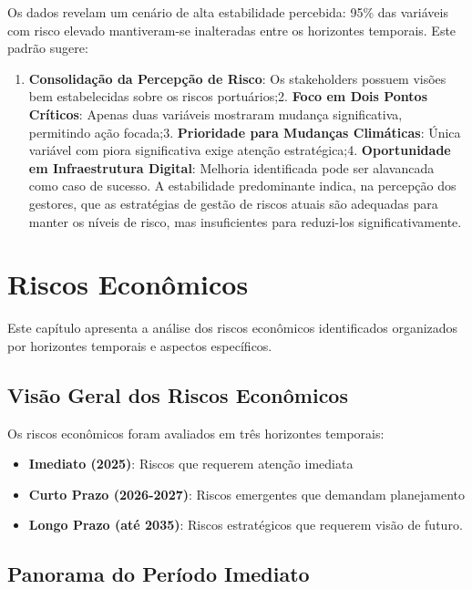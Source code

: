 \documentclass[
  portuguese,
  letterpaper,
  DIV=11,
  numbers=noendperiod]{scrreprt}
\providecommand{\tightlist}{%
  \setlength{\itemsep}{0pt}\setlength{\parskip}{0pt}}
\begin{document}
Os dados revelam um cenário de alta estabilidade percebida: 95\% das
variáveis com risco elevado mantiveram-se inalteradas entre os
horizontes temporais. Este padrão sugere:

\begin{enumerate}
\def\labelenumi{\arabic{enumi}.}
\tightlist
\item
  \textbf{Consolidação da Percepção de Risco}: Os stakeholders possuem
  visões bem estabelecidas sobre os riscos portuários;2. \textbf{Foco em
  Dois Pontos Críticos}: Apenas duas variáveis mostraram mudança
  significativa, permitindo ação focada;3. \textbf{Prioridade para
  Mudanças Climáticas}: Única variável com piora significativa exige
  atenção estratégica;4. \textbf{Oportunidade em Infraestrutura
  Digital}: Melhoria identificada pode ser alavancada como caso de
  sucesso. A estabilidade predominante indica, na percepção dos
  gestores, que as estratégias de gestão de riscos atuais são adequadas
  para manter os níveis de risco, mas insuficientes para reduzi-los
  significativamente.
\end{enumerate}


\chapter{Riscos Econômicos}\label{riscos-econuxf4micos-1}

Este capítulo apresenta a análise dos riscos econômicos identificados
organizados por horizontes temporais e aspectos específicos.

\section{Visão Geral dos Riscos
Econômicos}\label{visuxe3o-geral-dos-riscos-econuxf4micos}

Os riscos econômicos foram avaliados em três horizontes temporais:

\begin{itemize}
\tightlist
\item
  \textbf{Imediato (2025)}: Riscos que requerem atenção imediata
\item
  \textbf{Curto Prazo (2026-2027)}: Riscos emergentes que demandam
  planejamento
\item
  \textbf{Longo Prazo (até 2035)}: Riscos estratégicos que requerem
  visão de futuro.
\end{itemize}

\section{Panorama do Período
Imediato}\label{panorama-do-peruxedodo-imediato}
\end{document}
